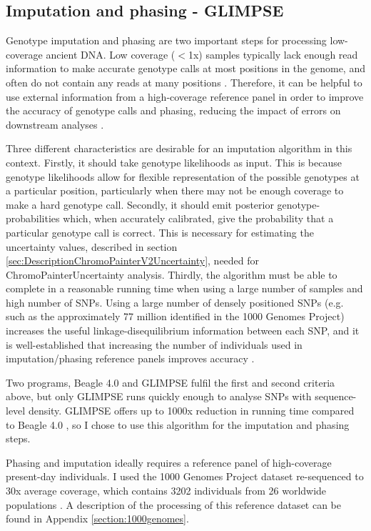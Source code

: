 \subsection{Imputation and phasing - GLIMPSE}

Genotype imputation and phasing are two important steps for processing low-coverage ancient DNA. Low coverage ($<$1x) samples typically lack enough read information to make accurate genotype calls at most positions in the genome, and often do not contain any reads at many positions \cite{nielsen2011genotype}. Therefore, it can be helpful to use external information from a high-coverage reference panel in order to improve the accuracy of genotype calls and phasing, reducing the impact of errors on downstream analyses \cite{rubinacci2021efficient}. 

Three different characteristics are desirable for an imputation algorithm in this context. Firstly, it should take genotype likelihoods as input. This is because genotype likelihoods allow for flexible representation of the possible genotypes at a particular position, particularly when there may not be enough coverage to make a hard genotype call. Secondly, it should emit posterior genotype-probabilities which, when accurately calibrated, give the probability that a particular genotype call is correct. This is necessary for estimating the uncertainty values, described in section \ref{sec:DescriptionChromoPainterV2Uncertainty}, needed for ChromoPainterUncertainty analysis. Thirdly, the algorithm must be able to complete in a reasonable running time when using a large number of samples and high number of SNPs. Using a large number of densely positioned SNPs (e.g. such as the approximately 77 million identified in the 1000 Genomes Project) increases the useful linkage-disequilibrium information between each SNP, and it is well-established that increasing the number of individuals used in imputation/phasing reference panels improves accuracy \cite{delaneau2018integrative, HUANG2009235, mccarthy2016reference, rubinacci2021efficient}. 

Two programs, Beagle 4.0 \cite{Browning2007} and GLIMPSE \cite{rubinacci2021efficient} fulfil the first and second criteria above, but only GLIMPSE runs quickly enough to analyse SNPs with sequence-level density. GLIMPSE offers up to 1000x reduction in running time compared to Beagle 4.0 \cite{rubinacci2021efficient}, so I chose to use this algorithm for the imputation and phasing steps.   

Phasing and imputation ideally requires a reference panel of high-coverage present-day individuals. I used the 1000 Genomes Project dataset re-sequenced to 30x average coverage, which contains 3202 individuals from 26 worldwide populations \cite{byrska2021high}. A description of the processing of this reference dataset can be found in Appendix \ref{section:1000genomes}.

